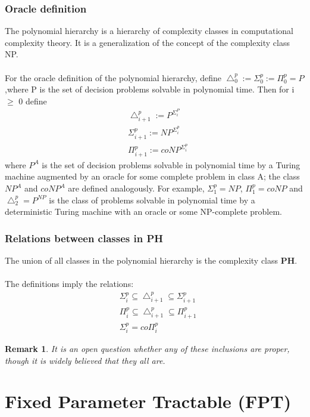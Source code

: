 \documentclass[12pt]{article}
\newtheorem*{remark}{Remark}
\begin{document}
\subsubsection{Oracle definition}
The polynomial hierarchy is a hierarchy of complexity classes in computational complexity theory. It is a generalization of the concept of the complexity class NP.
\\
\\
For the oracle definition of the polynomial hierarchy, define $\bigtriangleup_0^p:=\Sigma_0^p:=\Pi_0^p=P$,where P is the set of decision problems solvable in polynomial time. Then for i $\geq$ 0 define
\begin{align*}
    & \bigtriangleup_{i+1}^p:=P^{\Sigma_i^P} \\
    & \Sigma_{i+1}^p:=NP^{\Sigma_i^p} \\
    & \Pi_{i+1}^p:=coNP^{\Sigma_i^p}
\end{align*}
where $P^A$ is the set of decision problems solvable in polynomial time by a Turing machine augmented by an oracle for some complete problem in class A; the class $NP^A$ and $coNP^A$ are defined analogously. For example, $\Sigma_1^p = NP$, $\Pi_1^p = coNP$ and $\bigtriangleup_2^p = P^{NP}$ is the class of problems solvable in polynomial time by a deterministic Turing machine with an oracle or some NP-complete problem.
\subsubsection{Relations between classes in PH}
The union of all classes in the polynomial hierarchy is the complexity class \textbf{PH}.
\\
\\
The definitions imply the relations:
\begin{align*}
    & \Sigma_i^p \subseteq \bigtriangleup_{i+1}^p \subseteq \Sigma_{i+1}^p \\
    & \Pi_i^p \subseteq \bigtriangleup_{i+1}^p \subseteq \Pi_{i+1}^p\\
    & \Sigma_i^p = co\Pi_i^p
\end{align*}

\begin{remark}
    It is an open question whether any of these inclusions are proper, though it is widely believed that they all are.
\end{remark}

\section{Fixed Parameter Tractable (FPT)}
\end{document}
